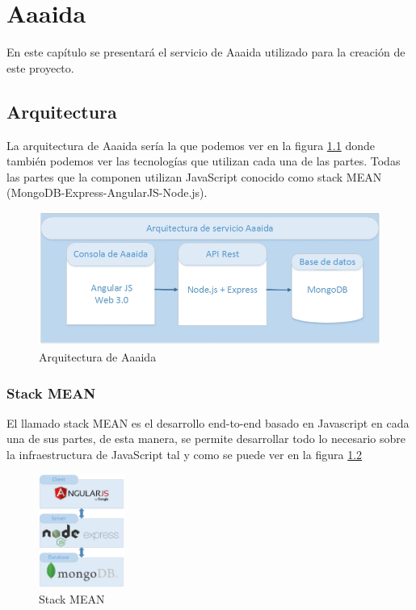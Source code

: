 \chapter{Aaaida}

En este capítulo se presentará el servicio de Aaaida utilizado para la creación de este proyecto. 

\section{Arquitectura}

La arquitectura de Aaaida sería la que podemos ver en la figura \ref{a:arquitectura} donde también podemos ver las tecnologías que utilizan cada una de las partes. Todas las partes que la componen utilizan JavaScript conocido como stack MEAN (MongoDB-Express-AngularJS-Node.js). 

\begin{figure}[htb]
\begin{center}
\includegraphics[width=1\textwidth]{./setup/arquitectura}
\caption{Arquitectura de Aaaida}
\label{a:arquitectura}
\end{center}
\end{figure}

\subsection{Stack MEAN}

El llamado stack MEAN es el desarrollo end-to-end basado en Javascript en
cada una de sus partes, de esta manera, se permite desarrollar todo lo necesario
sobre la infraestructura de JavaScript tal y como se puede ver en la figura \ref{mean:MEAN}

\begin{figure}[htb]
\begin{center}
\includegraphics[width=0.25\textwidth]{./setup/MEAN}
\caption{Stack MEAN}
\label{mean:MEAN}
\end{center}
\end{figure}


